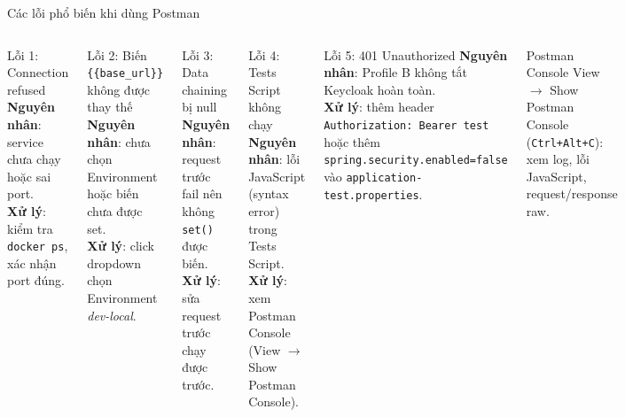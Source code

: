\documentclass[aspectratio=169,10pt]{beamer}
\begin{document}
\begin{frame}[shrink=6]{Các lỗi phổ biến khi dùng Postman}
  \begin{columns}
    \begin{alertblock}{Lỗi 1: Connection refused}
      \textbf{Nguyên nhân}: service chưa chạy hoặc sai port.\\
      \textbf{Xử lý}: kiểm tra \texttt{docker ps}, xác nhận port đúng.
    \end{alertblock}

    \begin{alertblock}{Lỗi 2: Biến \texttt{\{\{base\_url\}\}} không được thay thế}
      \textbf{Nguyên nhân}: chưa chọn Environment hoặc biến chưa được set.\\
      \textbf{Xử lý}: click dropdown chọn Environment \textit{dev-local}.
    \end{alertblock}

    \begin{alertblock}{Lỗi 3: Data chaining bị null}
      \textbf{Nguyên nhân}: request trước fail nên không \texttt{set()} được biến.\\
      \textbf{Xử lý}: sửa request trước chạy được trước.
    \end{alertblock}

    \begin{alertblock}{Lỗi 4: Tests Script không chạy}
      \textbf{Nguyên nhân}: lỗi JavaScript (syntax error) trong Tests Script.\\
      \textbf{Xử lý}: xem Postman Console (View $\to$ Show Postman Console).
    \end{alertblock}

    \begin{alertblock}{Lỗi 5: 401 Unauthorized}
      \textbf{Nguyên nhân}: Profile B không tắt Keycloak hoàn toàn.\\
      \textbf{Xử lý}: thêm header \texttt{Authorization: Bearer test}
      hoặc thêm \texttt{spring.security.enabled=false}
      vào \texttt{application-test.properties}.
    \end{alertblock}

    \begin{exampleblock}{Postman Console}
      View $\to$ Show Postman Console (\texttt{Ctrl+Alt+C}):\\
      xem log, lỗi JavaScript, request/response raw.
    \end{exampleblock}
  \end{columns}
\end{frame}
\end{document}
